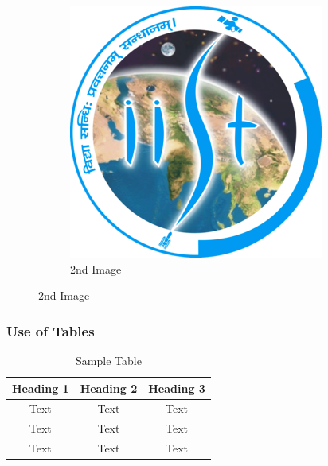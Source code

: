\documentclass[hyperref={bookmarks=false},aspectratio=169]{beamer}
\begin{document}
\begin{frame}
\begin{figure}
\begin{subfigure}[b]{0.35\textwidth}
      \includegraphics[width=\textwidth]{figures/Indian_Institute_of_Space_Science_and_Technology_Logo.png}
      \caption{2nd Image}
      \label{fig:img2}
    \end{subfigure}
  \end{figure}
\end{frame}

\begin{frame}
  \frametitle{Use of Tables}
  \begin{table}
    \centering
    \begin{tabular}{||c|c|c||}
      \hline
      \textbf{Heading 1} & \textbf{Heading 2} & \textbf{Heading 3}\\
      \hline
      Text & Text & Text \\
      \hline
      Text & Text & Text \\
      \hline
      Text & Text & Text \\
      \hline
    \end{tabular}
    \caption{Sample Table}

  \end{table}
\end{frame}
\end{document}
